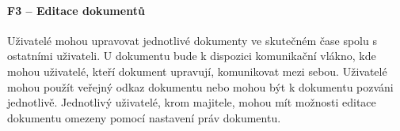 \paragraph{F3 -- Editace dokumentů}

Uživatelé mohou upravovat jednotlivé dokumenty ve skutečném čase spolu s ostatními uživateli.
U dokumentu bude k dispozici komunikační vlákno, kde mohou uživatelé, kteří dokument upravují, komunikovat mezi sebou.
Uživatelé mohou použít veřejný odkaz dokumentu nebo mohou být k dokumentu pozváni jednotlivě.
Jednotlivý uživatelé, krom majitele, mohou mít možnosti editace dokumentu omezeny pomocí nastavení práv dokumentu.
